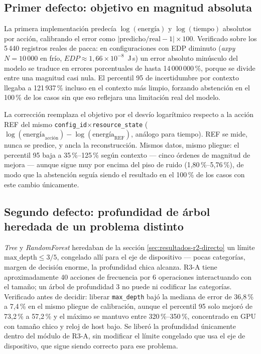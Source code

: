 \documentclass[12pt,oneside,spanish]{book}
\begin{document}
\subsection{Primer defecto: objetivo en magnitud absoluta}
\label{sec:resultados-r3-escala}

La primera implementación predecía $\log(\text{energía})$ y $\log(\text{tiempo})$ absolutos por acción, calibrando el error como $\left|\text{predicho}/\text{real} - 1\right| \times 100$. Verificado sobre los 5\,440 registros reales de pacca: en configuraciones con EDP diminuto (\textit{axpy} $N=10\,000$ en frío, $EDP \approx 1{,}66\times10^{-8}$~J\,s) un error absoluto minúsculo del modelo se traduce en errores porcentuales de hasta 14\,000\,000\,\%, porque se divide entre una magnitud casi nula. El percentil 95 de incertidumbre por contexto llegaba a 121\,937\,\% incluso en el contexto más limpio, forzando abstención en el 100\,\% de los casos sin que eso reflejara una limitación real del modelo.

La corrección reemplaza el objetivo por el desvío logarítmico respecto a la acción REF del mismo \texttt{config\_id}$\times$\texttt{resource\_state} ($\log(\text{energía}_{\text{acción}}) - \log(\text{energía}_{\text{REF}})$, análogo para tiempo). REF se mide, nunca se predice, y ancla la reconstrucción. Mismos datos, mismo pliegue: el percentil 95 baja a 35\,\%--125\,\% según contexto --- cinco órdenes de magnitud de mejora --- aunque sigue muy por encima del piso de ruido (1,80\,\%--5,76\,\%), de modo que la abstención seguía siendo el resultado en el 100\,\% de los casos con este cambio únicamente.

\subsection{Segundo defecto: profundidad de árbol heredada de un problema distinto}
\label{sec:resultados-r3-profundidad}

\textit{Tree} y \textit{RandomForest} heredaban de la sección \ref{sec:resultados-r2-directo} un límite $\text{max\_depth} \leq 3/5$, congelado allí para el eje de dispositivo --- pocas categorías, margen de decisión enorme, la profundidad chica alcanza. R3-A tiene aproximadamente 40 acciones de frecuencia por 6 operaciones interactuando con el tamaño; un árbol de profundidad 3 no puede ni codificar las categorías. Verificado antes de decidir: liberar \texttt{max\_depth} bajó la mediana de error de 36,8\,\% a 7,4\,\% en el mismo pliegue de calibración, aunque el percentil 95 solo mejoró de 73,2\,\% a 57,2\,\% y el máximo se mantuvo entre 320\,\%--350\,\%, concentrado en GPU con tamaño chico y reloj de host bajo. Se liberó la profundidad únicamente dentro del módulo de R3-A, sin modificar el límite congelado que usa el eje de dispositivo, que sigue siendo correcto para ese problema.
\end{document}
